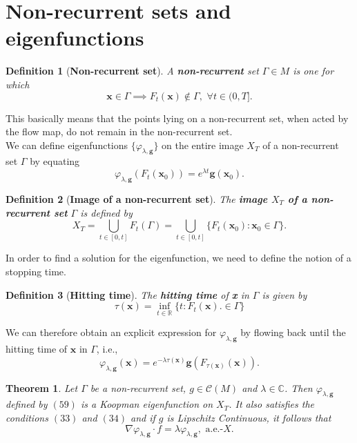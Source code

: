 \documentclass[]{article}
\newtheorem{definition}{Definition}
\newtheorem{theorem}{Theorem}
\begin{document}
\section{Non-recurrent sets and eigenfunctions}
\begin{definition}[\textbf{Non-recurrent set}]
A \textbf{non-recurrent} set $\Gamma \in M$ is one for which
\begin{equation}
	\textbf{x} \in \Gamma \implies F_t(\textbf{x}) \notin \Gamma, \,\, \forall t \in (0,T].
\end{equation}
\end{definition}
This basically means that the points lying on a non-recurrent set, when acted by the flow map, do not remain in the non-recurrent set. \\
We can define eigenfunctions $\{\varphi_{\lambda, \textbf{g}}\}$ on the entire image $X_T$ of a non-recurrent set $\Gamma$ by equating
\begin{equation}
	\varphi_{\lambda, \textbf{g}} (F_t(\textbf{x}_0)) = e^{\lambda t}\textbf{g}(\textbf{x}_0).
\end{equation}
\begin{definition}[\textbf{Image of a non-recurrent set}]
The \textbf{image $X_T$ of a non-recurrent set} $\Gamma$ is defined by
\begin{equation}
	X_T = \bigcup_{t \in [0,t]} F_t(\Gamma) = \bigcup_{t \in [0,t]} \{F_t(\textbf{x}_0): \textbf{x}_0 \in \Gamma\}.
\end{equation}
\end{definition}
In order to find a solution for the eigenfunction, we need to define the notion of a stopping time.
\begin{definition}[\textbf{Hitting time}]
The \textbf{hitting time} of \textbf{x} in $\Gamma$ is given by
\begin{equation}
	\tau(\textbf{x}) = \inf_{t \in \mathbb{R}} \{t:F_t(\textbf{x}). \in \Gamma\}
\end{equation}
\end{definition}
We can therefore obtain an explicit expression for $\varphi_{\lambda, \textbf{g}}$ by flowing back until the hitting time of $\textbf{x}$ in $\Gamma$, i.e.,
\begin{equation}
	\varphi_{\lambda, \textbf{g}}(\textbf{x}) = e^{-\lambda \tau(\textbf{x})} \textbf{g}(F_{\tau(\textbf{x})}(\textbf{x})).
\end{equation}
\begin{theorem}
Let $\Gamma$ be a non-recurrent set, $g \in \mathcal{C}(M)$ and $\lambda \in \mathbb{C}$. Then $\varphi_{\lambda, \textbf{g}}$ defined by $(59)$ is a Koopman eigenfunction on $X_T$. It also satisfies the conditions $(33)$ and $(34)$ and if $g$ is Lipschitz Continuous, it follows that 
\begin{equation}
	\nabla \varphi_{\lambda, \textbf{g}} \cdot f = \lambda \varphi_{\lambda, \textbf{g}}, \,\, \text{a.e.-$X$}.
\end{equation}
\end{theorem}
\end{document}
